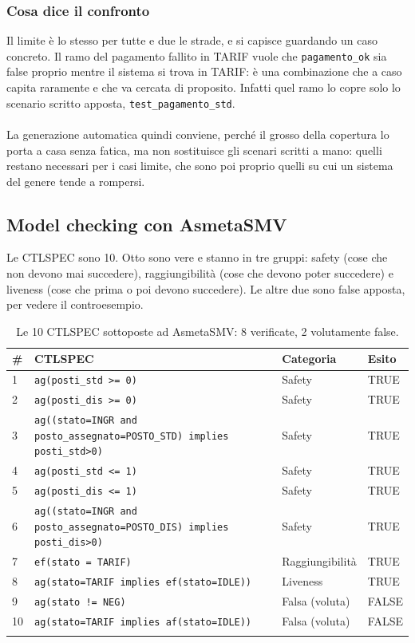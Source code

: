 
\subsubsection{Cosa dice il confronto}

Il limite è lo stesso per tutte e due le strade, e si capisce guardando un caso concreto.
Il ramo del pagamento fallito in TARIF vuole che \texttt{pagamento\_ok} sia false proprio
mentre il sistema si trova in TARIF: è una combinazione che a caso capita raramente e che
va cercata di proposito. Infatti quel ramo lo copre solo lo scenario scritto apposta,
\texttt{test\_pagamento\_std}.
\\ \\
La generazione automatica quindi conviene, perché il grosso della copertura lo porta a
casa senza fatica, ma non sostituisce gli scenari scritti a mano: quelli restano
necessari per i casi limite, che sono poi proprio quelli su cui un sistema del genere
tende a rompersi.

\subsection{Model checking con AsmetaSMV}

Le CTLSPEC sono 10. Otto sono vere e stanno in tre gruppi: safety (cose che non devono
mai succedere), raggiungibilità (cose che devono poter succedere) e liveness (cose che
prima o poi devono succedere). Le altre due sono false apposta, per vedere il controesempio.

\begin{longtable}{@{}p{0.6cm}p{7.3cm}p{2.2cm}p{1.3cm}@{}}
\toprule
\textbf{\#} & \textbf{CTLSPEC} & \textbf{Categoria} & \textbf{Esito} \\
\midrule
\endhead
1  & \texttt{ag(posti\_std >= 0)} & Safety & TRUE \\
2  & \texttt{ag(posti\_dis >= 0)} & Safety & TRUE \\
3  & \texttt{ag((stato=INGR and posto\_assegnato=POSTO\_STD) implies posti\_std>0)} & Safety & TRUE \\
4  & \texttt{ag(posti\_std <= 1)} & Safety & TRUE \\
5  & \texttt{ag(posti\_dis <= 1)} & Safety & TRUE \\
6  & \texttt{ag((stato=INGR and posto\_assegnato=POSTO\_DIS) implies posti\_dis>0)} & Safety & TRUE \\
7  & \texttt{ef(stato = TARIF)} & Raggiungibilità & TRUE \\
8  & \texttt{ag(stato=TARIF implies ef(stato=IDLE))} & Liveness & TRUE \\
9  & \texttt{ag(stato != NEG)} & Falsa (voluta) & FALSE \\
10 & \texttt{ag(stato=TARIF implies af(stato=IDLE))} & Falsa (voluta) & FALSE \\
\bottomrule
\caption{Le 10 CTLSPEC sottoposte ad AsmetaSMV: 8 verificate, 2 volutamente false.}
\label{tab:ctlspec}
\end{longtable}

